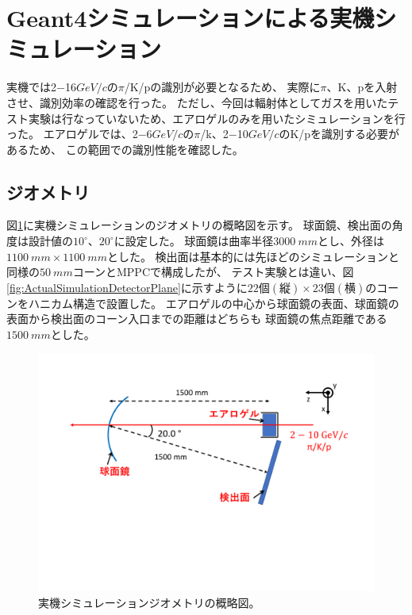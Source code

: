 \section{Geant4シミュレーションによる実機シミュレーション}
実機では2$-$16\space$\si{GeV/c}$の$\pi$/K/pの識別が必要となるため、
実際に$\pi$、K、pを入射させ、識別効率の確認を行った。
ただし、今回は輻射体としてガスを用いたテスト実験は行なっていないため、エアロゲルのみを用いたシミュレーションを行った。
エアロゲルでは、2$-$6\space$\si{GeV/c}$の$\pi$/k、2$-$10\space$\si{GeV/c}$のK/pを識別する必要があるため、
この範囲での識別性能を確認した。

\subsection{ジオメトリ}
図\ref{fig:ActualSimulationSetup}に実機シミュレーションのジオメトリの概略図を示す。
球面鏡、検出面の角度は設計値の$10^{\circ}$、$20^{\circ}$に設定した。
球面鏡は曲率半径$\SI{3000}{mm}$とし、外径は$\SI{1100}{mm}\times\SI{1100}{mm}$とした。
検出面は基本的には先ほどのシミュレーションと同様の$\SI{50}{mm}$コーンとMPPCで構成したが、
テスト実験とは違い、図\ref{fig:ActualSimulationDetectorPlane}に示すように$22個(縦)\times23個(横)$のコーンをハニカム構造で設置した。
エアロゲルの中心から球面鏡の表面、球面鏡の表面から検出面のコーン入口までの距離はどちらも
球面鏡の焦点距離である$\SI{1500}{mm}$とした。

\begin{figure}
  \centering
  \includegraphics[width=15cm]{images/chapter4/ActualSimulationSetup.pdf}
  \caption{
    実機シミュレーションジオメトリの概略図。
  }
  \label{fig:ActualSimulationSetup}
\end{figure}


